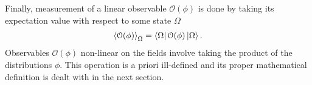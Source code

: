 Finally, measurement of a linear observable $\mathcal{O}(\phi)$ is done by taking its expectation value with respect to some state $\Omega$
\begin{align}
	\left< \mathcal{O}(\phi) \right>_\Omega =\bra{\Omega} \mathcal{O}(\phi) \ket{\Omega} .
\end{align}
Observables $\mathcal{O}(\phi)$ non-linear on the fields involve taking the product of the distributions $\phi$. This operation is a priori ill-defined and its proper mathematical definition is dealt with in the next section.

%
